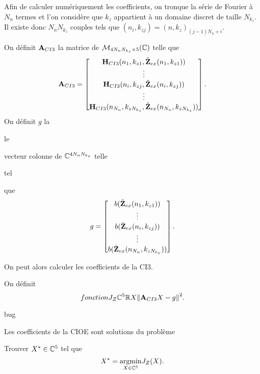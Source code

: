     Afin de calculer numériquement les coefficients, on tronque la série de Fourier à \(N_{n}\) termes et l'on considère que \(k_z\) appartient à un domaine discret de taille \(N_{k_z}\). Il existe donc \(N_{n}N_{k_z}\) couples tels que \((n_i,k_{zj}) = (n,k_z)_{(j-1)N_{n}+i}\).
    \begin{defn}
      On définit \(\mathbf{A}_{CI3}\) la matrice de \(\mathcal{M}_{4N_{n}N_{k_z}\times5}(\mathbb C)\) telle que
      \begin{equation*}
        \mathbf{A}_{CI3} = 
        \begin{bmatrix}
          \mathbf{H}_{CI3}(n_1,k_{z1},\hat{\mathbf{Z}}_{ex}(n_1,k_{z1}))
          \\
          \vdots
          \\
          \mathbf{H}_{CI3}(n_i,k_{zj},\hat{\mathbf{Z}}_{ex}(n_i,k_{zj}))
          \\
          \vdots
          \\
          \mathbf{H}_{CI3}(n_{N_n},k_{zN_{k_z}},\hat{\mathbf{Z}}_{ex}(n_{N_n},k_{zN_{k_z}}))
        \end{bmatrix}.
      \end{equation*}
      On définit \(g\) la
\begin{REM}
  le
\end{REM} 

       vecteur colonne de \(\mathbb C^{4N_{n}N_{k_z}}\) telle
\begin{REM}
  tel
\end{REM} 
        que
      \begin{equation*}
        g = 
        \begin{bmatrix}
          b(\hat{\mathbf{Z}}_{ex}(n_1,k_{z1}))
          \\
          \vdots
          \\
          b(\hat{\mathbf{Z}}_{ex}(n_i,k_{zj}))
          \\
          \vdots
          \\
          b(\hat{\mathbf{Z}}_{ex}(n_{N_n},k_{zN_{k_z}}))
        \end{bmatrix}.
      \end{equation*}
    \end{defn}

    On peut alors calculer les coefficients de la CI3.
    \begin{defn}
      On définit
      \begin{equation*}
        fonction{J_Z}{\mathbb C^5}{\mathbb R}{X}{\left\lVert{\mathbf{A}}_{CI3}X - {g}\right\rVert^2}.
      \end{equation*}
\begin{REM}
  bug
\end{REM} 

    \end{defn}
    \begin{thm}

      Les coefficients de la CIOE sont solutions du problème

      Trouver \(X^* \in \mathbb C^5\) tel que
      \begin{equation*}
        X^* = {\underset{X\in \mathbb C^5}{\operatorname{argmin}}}  J_Z(X).
      \end{equation*}
    \end{thm}


